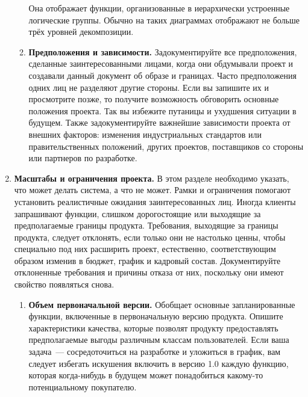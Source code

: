 \documentclass{../../text-style}
\begin{document}
\begin{enumerate}
\begin{enumerate}
        Она отображает функции, организованные в иерархически устроенные логические группы.
        Обычно на таких диаграммах отображают не больше трёх уровней декомпозиции.
        \item \textbf{Предположения и зависимости.}
        Задокументируйте все предположения, сделанные заинтересованными лицами, когда они обдумывали проект и создавали данный документ об образе и границах.
        Часто предположения одних лиц не разделяют другие стороны.
        Если вы запишите их и просмотрите позже, то получите возможность обговорить основные положения проекта.
        Так вы избежите путаницы и ухудшения ситуации в будущем.
        Также задокументируйте важнейшие зависимости проекта от внешних факторов: изменения индустриальных стандартов или правительственных положений, других проектов, поставщиков со стороны или партнеров по разработке.
    \end{enumerate}
    \item \textbf{Масштабы и ограничения проекта.}
    В этом разделе необходимо указать, что может делать система, а что не может.
    Рамки и ограничения помогают установить реалистичные ожидания заинтересованных лиц.
    Иногда клиенты запрашивают функции, слишком дорогостоящие или выходящие за предполагаемые границы продукта.
    Требования, выходящие за границы продукта, следует отклонять, если только они не настолько ценны, чтобы специально под них расширить проект, естественно, соответствующим образом изменив в бюджет, график и кадровый состав.
    Документируйте отклоненные требования и причины отказа от них, поскольку они имеют свойство появляться снова.
    \begin{enumerate}
        \item \textbf{Объем первоначальной версии.}
        Обобщает основные запланированные функции, включенные в первоначальную версию продукта.
        Опишите характеристики качества, которые позволят продукту предоставлять предполагаемые выгоды различным классам пользователей.
        Если ваша задача~--- сосредоточиться на разработке и уложиться в график, вам следует избегать искушения включить в версию 1.0 каждую функцию, которая когда-нибудь в будущем может понадобиться какому-то потенциальному покупателю.


\end{enumerate}
\end{enumerate}
\end{document}
